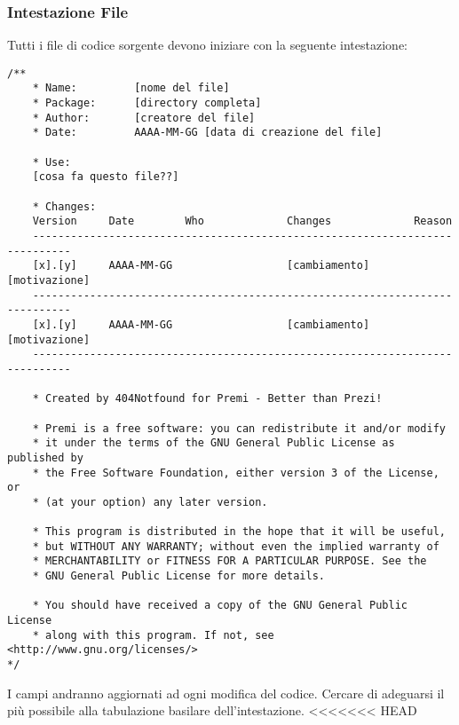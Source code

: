 \subsubsection{Intestazione File}
Tutti i file di codice sorgente devono iniziare con la seguente intestazione:
\color{blue}\begin{lstlisting}[frame=single]
/**	
	* Name: 		[nome del file]
	* Package: 		[directory completa]
	* Author: 		[creatore del file]
	* Date: 		AAAA-MM-GG [data di creazione del file]

	* Use:
	[cosa fa questo file??]
	
	* Changes:
	Version		Date		Who 			Changes				Reason
	----------------------------------------------------------------------------
	[x].[y]		AAAA-MM-GG					[cambiamento]		[motivazione]
	----------------------------------------------------------------------------
	[x].[y]		AAAA-MM-GG					[cambiamento]		[motivazione]
	----------------------------------------------------------------------------

	* Created by 404Notfound for Premi - Better than Prezi!

	* Premi is a free software: you can redistribute it and/or modify
	* it under the terms of the GNU General Public License as published by
	* the Free Software Foundation, either version 3 of the License, or
	* (at your option) any later version.

	* This program is distributed in the hope that it will be useful,
	* but WITHOUT ANY WARRANTY; without even the implied warranty of
	* MERCHANTABILITY or FITNESS FOR A PARTICULAR PURPOSE. See the
	* GNU General Public License for more details.

	* You should have received a copy of the GNU General Public License
	* along with this program. If not, see <http://www.gnu.org/licenses/>
*/

\end{lstlisting}\color{black}
I campi andranno aggiornati ad ogni modifica del codice. Cercare di adeguarsi il più possibile alla tabulazione basilare dell'intestazione.
<<<<<<< HEAD
